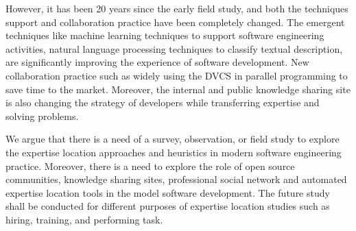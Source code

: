 However, it has been 20 years since the early field study, and both the techniques support and collaboration practice have been completely changed. The emergent techniques like machine learning techniques to support software engineering activities, natural language processing techniques to classify textual description, are significantly improving the experience of software development. New collaboration practice such as widely using the DVCS in parallel programming to save time to the market. Moreover, the internal and public knowledge sharing site is also changing the strategy of developers while transferring expertise and solving problems.

We argue that there is a need of a survey, observation, or field study to explore the expertise location approaches and heuristics in modern software engineering practice. Moreover, there is a need to explore the role of open source communities, knowledge sharing sites, professional social network and automated expertise location tools in the model software development. The future study shall be conducted for different purposes of expertise location studies such as hiring, training, and performing task.